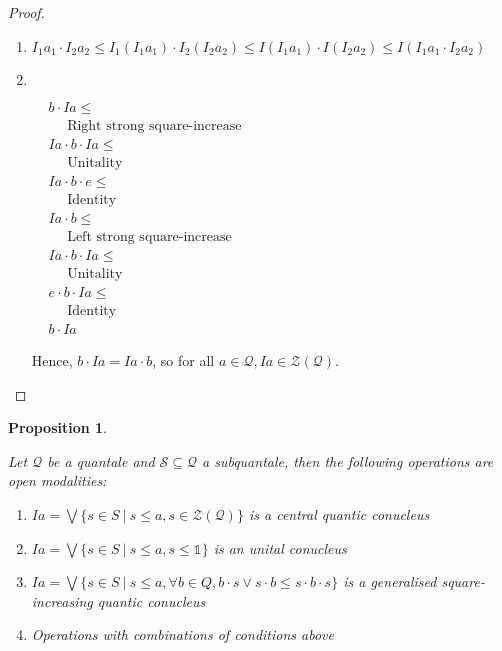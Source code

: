 \documentclass[a4paper]{article}
\theoremstyle{defin}
\theoremstyle{theorem}
\theoremstyle{prop}
\newtheorem{prop}{Proposition}
\theoremstyle{lemma}
\theoremstyle{ex}
\theoremstyle{col}
\begin{document}
\begin{proof}
$ $

\begin{enumerate}
  \item $I_1 a_1 \cdot I_2 a_2 \leq I_1 (I_1 a_1) \cdot I_2 (I_2 a_2) \leq I (I_1 a_1) \cdot I (I_2 a_2) \leq I (I_1 a_1 \cdot I_2 a_2)$
  \item $ $

    $\begin{array}{lll}
    & b \cdot I a \leq & \\
    & \:\:\:\:\:\: \text{Right strong square-increase}& \\
    &I a \cdot b \cdot I a \leq & \\
    & \:\:\:\:\:\: \text{Unitality}& \\
    & I a \cdot b \cdot e \leq & \\
    & \:\:\:\:\:\: \text{Identity}& \\
    &I a \cdot b \leq & \\
    & \:\:\:\:\:\: \text{Left strong square-increase}& \\
    &I a \cdot b \cdot I a \leq & \\
    & \:\:\:\:\:\: \text{Unitality}& \\
    &e \cdot b \cdot I a \leq & \\
    & \:\:\:\:\:\: \text{Identity}& \\
    &b \cdot I a&
    \end{array}$

  Hence, $b \cdot I a = I a \cdot b$, so for all $a \in \mathcal{Q}, I a \in \mathcal{Z}(\mathcal{Q})$.
\end{enumerate}
\end{proof}

\begin{prop}
$ $

Let $\mathcal{Q}$ be a quantale and $\mathcal{S} \subseteq \mathcal{Q}$ a subquantale, then the following operations are open modalities:

\begin{enumerate}
  \item $I a = \bigvee \{ s \in S \: | \: s \leq a, s \in \mathcal{Z}(\mathcal{Q}) \}$ is a central quantic conucleus
  \item $I a = \bigvee \{ s \in S \: | \: s \leq a, s \leq \mathds{1} \}$ is an unital conucleus
  \item $I a = \bigvee \{ s \in S \: | \: s \leq a, \forall b \in Q, b \cdot s \vee s \cdot b \leq s \cdot b \cdot s\}$ is a generalised square-increasing quantic conucleus
  \item Operations with combinations of conditions above
\end{enumerate}
\end{prop}
\end{document}
